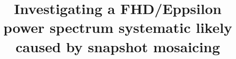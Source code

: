 \documentclass[linenumbers]{aastex631}
\begin{document}
\title{Investigating a FHD/Eppsilon power spectrum systematic likely caused by snapshot mosaicing}


\end{document}
